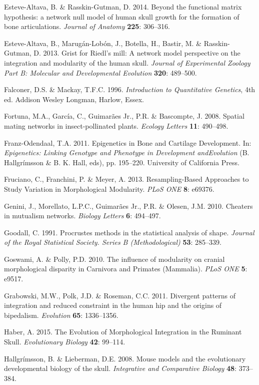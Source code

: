 \documentclass[12pt,]{article}
\begin{document}
Esteve-Altava, B. \& Rasskin-Gutman, D. 2014. Beyond the functional
matrix hypothesis: a network null model of human skull growth for the
formation of bone articulations. \emph{Journal of Anatomy} \textbf{225}:
306--316.

Esteve-Altava, B., Marugán-Lobón, J., Botella, H., Bastir, M. \&
Rasskin-Gutman, D. 2013. Grist for Riedl's mill: A network model
perspective on the integration and modularity of the human skull.
\emph{Journal of Experimental Zoology Part B: Molecular and
Developmental Evolution} \textbf{320}: 489--500.

Falconer, D.S. \& Mackay, T.F.C. 1996. \emph{Introduction to
Quantitative Genetics}, 4th ed. Addison Wesley Longman, Harlow, Essex.

Fortuna, M.A., García, C., Guimarães Jr., P.R. \& Bascompte, J. 2008.
Spatial mating networks in insect-pollinated plants. \emph{Ecology
Letters} \textbf{11}: 490--498.

Franz-Odendaal, T.A. 2011. Epigenetics in Bone and Cartilage
Development. In: \emph{Epigenetics: Linking Genotype and Phenotype in
Development andEvolution} (B. Hallgrímsson \& B. K. Hall, eds), pp.
195--220. University of California Press.

Fruciano, C., Franchini, P. \& Meyer, A. 2013. Resampling-Based
Approaches to Study Variation in Morphological Modularity. \emph{PLoS
ONE} \textbf{8}: e69376.

Genini, J., Morellato, L.P.C., Guimarães Jr., P.R. \& Olesen, J.M. 2010.
Cheaters in mutualism networks. \emph{Biology Letters} \textbf{6}:
494--497.

Goodall, C. 1991. Procrustes methods in the statistical analysis of
shape. \emph{Journal of the Royal Statistical Society. Series B
(Methodological)} \textbf{53}: 285--339.

Goswami, A. \& Polly, P.D. 2010. The influence of modularity on cranial
morphological disparity in Carnivora and Primates (Mammalia). \emph{PLoS
ONE} \textbf{5}: e9517.

Grabowski, M.W., Polk, J.D. \& Roseman, C.C. 2011. Divergent patterns of
integration and reduced constraint in the human hip and the origins of
bipedalism. \emph{Evolution} \textbf{65}: 1336--1356.

Haber, A. 2015. The Evolution of Morphological Integration in the
Ruminant Skull. \emph{Evolutionary Biology} \textbf{42}: 99--114.

Hallgrímsson, B. \& Lieberman, D.E. 2008. Mouse models and the
evolutionary developmental biology of the skull. \emph{Integrative and
Comparative Biology} \textbf{48}: 373--384.
\end{document}
